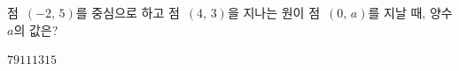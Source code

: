 점~$(-2,\,5)$를 중심으로 하고 점~$(4,\,3)$을 지나는 원이 점~$(0,\,a)$를 지날 때, 양수 $a$의 값은?
\begin{choices32}{$7$}{$9$}{$11$}{$13$}{$15$}\end{choices32}
